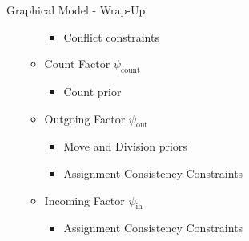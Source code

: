 \begin{frame}{Graphical Model - Wrap-Up}
\begin{minipage}{0.71\textwidth}
\begin{itemize}
\begin{itemize}
\begin{itemize}
                      \item[] Conflict constraints
                \end{itemize}
                  \item[\usebox{\countFac}] Count Factor $\psi_{\text{count}}$
                \begin{itemize}
                      \item[] Count prior
                \end{itemize}
                  \item[\usebox{\outFac}] Outgoing Factor $\psi_{\text{out}}$
                \begin{itemize}
                      \item[] Move and Division priors
                      \item[] Assignment Consistency Constraints
                \end{itemize}
                  \item[\usebox{\inFac}] Incoming Factor $\psi_{\text{in}}$
                \begin{itemize}
                      \item[] Assignment Consistency Constraints
                \end{itemize}
            \end{itemize}
        \end{itemize}
    \end{minipage}
    \begin{minipage}{0.25\textwidth}
        \newcommand{\distancebetweenlayers}{60}
        \newcommand{\scalingfactor}{0.8}
        \scalebox{0.55}{
            \begin{tikzpicture}[every node/.append style={scale=0.98}]
                
            \end{tikzpicture}
        }\hfill
        \vfill
    \end{minipage}
\end{frame}

